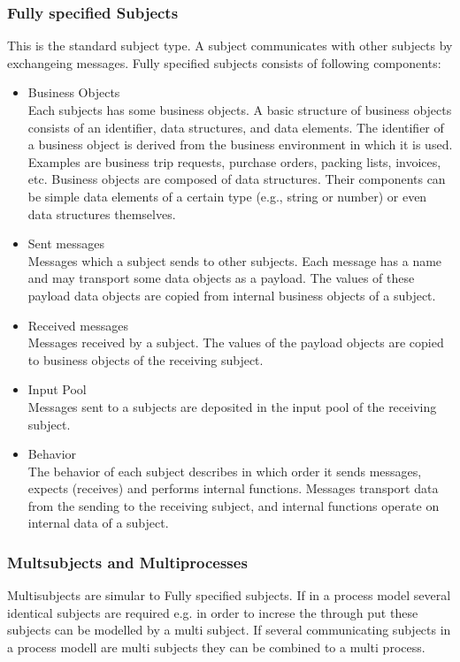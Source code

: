 \subsubsection{Fully specified Subjects}
This is the standard subject type. A subject communicates with other subjects by exchangeing messages.
Fully specified subjects consists of following components:
\begin{itemize}
	\item Business Objects\\
	Each subjects has some business objects. A basic structure of business objects consists of an identifier, data structures, and data elements. The identifier of a business object is derived from the business environment in which it is used. Examples are business trip requests, purchase orders, packing lists, invoices, etc.
	Business objects are composed of data structures. Their components can be simple data elements of a certain type (e.g., string or number) or even data structures themselves. 
	\item Sent messages\\
	Messages which a subject sends to other subjects. Each message has a name and may transport some data objects as a payload. The values of these payload data objects are copied from internal business objects of a subject.
	\item Received messages\\
	Messages received by a subject. The values of the payload objects are copied to business objects of the receiving subject.
	\item Input Pool\\
	Messages sent to a subjects are deposited in the input pool of the receiving subject.
	\item Behavior \\
	The behavior of each subject describes in which order it sends messages, expects (receives) and performs internal functions. Messages transport data from the sending to the receiving subject, and internal functions operate on internal data of a subject. 
\end{itemize}


\subsubsection{Multsubjects and Multiprocesses}
Multisubjects are simular to Fully specified subjects. If in a process model several identical subjects are required e.g. in order to increse the through put these subjects can be modelled by a multi subject. If several communicating subjects in a process modell are multi subjects they can be combined to a multi process.

